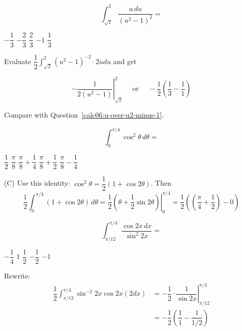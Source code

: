 \newpage




\question
\[
\int_{\sqrt{2}}^{2} \dfrac{u\,du}{\left(u^{2}-1\right)^{2}}=
\]
\begin{choices}
  \choice $-\dfrac{1}{3}$
  \choice $-\dfrac{2}{3}$
  \choice $\dfrac{2}{3}$
  \choice $-1$
  \CorrectChoice $\dfrac{1}{3}$
\end{choices}
\begin{solution}
Evaluate $\dfrac{1}{2} \int_{\sqrt{2}}^{2}\left(u^{2}-1\right)^{-2} \cdot 2 u d u$ and get


\[
-\left.\dfrac{1}{2\left(u^{2}-1\right)}\right|_{\sqrt{2}} ^{2} \quad \text { or } \quad-\dfrac{1}{2}\left(\dfrac{1}{3}-\dfrac{1}{1}\right)
\]

Compare with Question~\ref{calc06:u-over-u2-minus-1}.
\end{solution}

\question
\[
\int_{0}^{\pi / 4} \cos ^{2} \theta\,d\theta=
\]
\begin{choices}
  \choice $\dfrac{1}{2}$
  \choice $\dfrac{\pi}{8}$
  \CorrectChoice $\dfrac{\pi}{8}+\dfrac{1}{4}$
  \choice $\dfrac{\pi}{8}+\dfrac{1}{2}$
  \choice $\dfrac{\pi}{8}-\dfrac{1}{4}$
\end{choices}
\begin{solution}
(C) Use this identity: $\cos ^{2} \theta=\dfrac{1}{2}(1+\cos 2 \theta)$. Then
\[
\dfrac{1}{2} \int_{0}^{\pi / 4}(1+\cos 2 \theta)\,d\theta=\left.\dfrac{1}{2}\left(\theta+\dfrac{1}{2} \sin 2 \theta\right)\right|_{0} ^{\pi / 4}=\dfrac{1}{2}\left(\left(\dfrac{\pi}{4}+\dfrac{1}{2}\right)-0\right)
\]
\end{solution}




\newpage




\question
\[
\int_{\pi / 12}^{\pi / 4} \dfrac{\cos 2 x\,dx}{\sin ^{2} 2 x}=
\]
\begin{choices}
  \choice $-\dfrac{1}{4}$
  \choice $1$
  \CorrectChoice $\dfrac{1}{2}$
  \choice $-\dfrac{1}{2}$
  \choice $-1$
\end{choices}
\begin{solution}
Rewrite:
\[
\begin{aligned}
\dfrac{1}{2} \int_{\pi / 12}^{\pi / 4} \sin ^{-2} 2 x \cos 2 x(2 d x) & =-\left.\dfrac{1}{2} \cdot \dfrac{1}{\sin 2 x}\right|_{\pi / 12} ^{\pi / 4} \\
& =-\dfrac{1}{2}\left(\dfrac{1}{1}-\dfrac{1}{1 / 2}\right)
\end{aligned}
\]
\end{solution}

